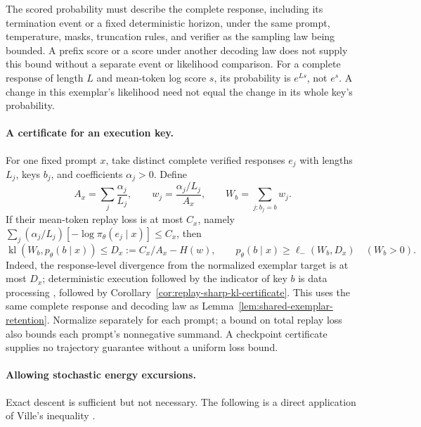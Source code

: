 \documentclass{article}
\newcommand{\1}{\mathbf 1}
\theoremstyle{remark}
\theoremstyle{definition}
\theoremstyle{plain}
\begin{document}
The scored probability must describe the complete response, including its
termination event or a fixed deterministic horizon, under the same prompt,
temperature, masks, truncation rules, and verifier as the sampling law being
bounded. A prefix score or a score under another decoding law does not
supply this bound without a separate event or likelihood comparison.
For a complete response of length $L$ and mean-token log score $s$, its
probability is $e^{Ls}$, not $e^s$. A change in this exemplar's likelihood
need not equal the change in its whole key's probability.

\paragraph{A certificate for an execution key.}
For one fixed prompt $x$, take distinct complete verified responses $e_j$
with lengths $L_j$, keys $b_j$, and coefficients $\alpha_j>0$. Define
\[
 A_x=\sum_j\frac{\alpha_j}{L_j},\qquad
 w_j=\frac{\alpha_j/L_j}{A_x},\qquad
 W_b=\sum_{j:b_j=b}w_j.
\]
If their mean-token replay loss is at most $C_x$, namely
$\sum_j(\alpha_j/L_j)[-\log\pi_\theta(e_j\mid x)]\le C_x$, then
\begin{equation}
 \operatorname{kl}\!\left(W_b,p_\theta(b\mid x)\right)
 \le D_x:=C_x/A_x-H(w),\qquad
 p_\theta(b\mid x)\ge\ell_-(W_b,D_x)\quad(W_b>0).
 \label{eq:complete-exemplar-key-certificate}
\end{equation}
Indeed, the response-level divergence from the normalized exemplar target is
at most $D_x$; deterministic execution followed by the indicator of key $b$
is data processing \citep[Theorem~9]{vanerven2014renyi}, followed by
Corollary~\ref{cor:replay-sharp-kl-certificate}. This uses the same complete
response and decoding law as Lemma~\ref{lem:shared-exemplar-retention}.
Normalize separately for each prompt; a bound on total replay loss also
bounds each prompt's nonnegative summand. A checkpoint certificate supplies
no trajectory guarantee without a uniform loss bound.

\paragraph{Allowing stochastic energy excursions.}
Exact descent is sufficient but not necessary. The following is a direct
application of Ville's inequality \citep[Lemma~1]{howard2020timeuniform}.
\end{document}

